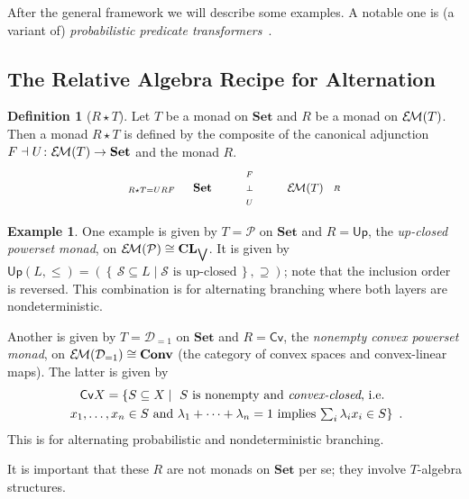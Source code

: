 \documentclass[9pt, preprint]{sigplanconf}
\theoremstyle{theorem}
\theoremstyle{definition}
\newtheorem{definition}[theorem]{Definition}
\newtheorem{example}[theorem]{Example}
\newcommand{\calS}{\mathcal{S}}
\newcommand{\pow}{\mathcal{P}}
\newcommand{\dist}{\mathcal{D}_{=1}}
\newcommand{\set}[2]{\left\{\, #1 \mathrel{}\middle|\mathrel{} #2 \,\right\}}
\newcommand{\Set}{\mathbf{Set}}
\newcommand{\Sets}{\Set}
\newcommand{\CL}{\mathbf{CL}}
\newcommand{\Conv}{\mathbf{Conv}}
\newcommand{\EM}{\mathcal{E}{\kern-.5ex}\mathcal{M}}
\newcommand{\biglor}{\bigvee}
\newcommand{\Upx}{\mathsf{Up}}
\renewcommand{\subset}{\subseteq}
\newcommand{\RC}{\mathsf{Cv}}
\begin{document}
After
the general framework we will describe some examples. A notable
one is (a variant of)  \emph{probabilistic predicate transformers}~\cite{MorganMS96}.



\subsection{The Relative Algebra Recipe for Alternation}
\label{sub:general-theory-two-player}



\begin{definition}[$R\star T$]
  Let $T$ be a monad on $\Set$ and $R$ be a monad on $\EM(T)$.
  Then a monad $R \star T$ is defined by the composite of the
  canonical adjunction $F \dashv U \colon \EM(T) \to \Set$
  and the monad $R$.
  \begin{equation}\label{eq:monad-composition}
   \small
    \vcenter{
    \xymatrix@R-1.2em{
      \Set
        \ar@(lu,ld)_-{R \star T = U R F}[]
        \ar@/^/[rr]^-{F}
        \ar@{}[rr]|-{\bot}
      &&  \EM(T) \ar@/^/[ll]^-{U}
        \ar@(ru,rd)^-{R}[]
    }}
  \end{equation}
\end{definition}
\begin{example}\label{ex:rStarTExample}
 One example is given by $T=\pow$ on $\Sets$ and $R=\Upx$, the
 \emph{up-closed powerset monad}, on $\EM(\pow)\cong \CL_{\biglor}$.
 It is given by
 \begin{math}
      \Upx (L, \le) = (\set{\calS \subset L}{\text{$\calS$ is up-closed}}, \supseteq)
 \end{math}; note that the inclusion order is reversed.
 This combination is for alternating branching where both layers are
 nondeterministic.

Another is given by
 $T=\dist$ on $\Sets$ and $R=\RC$, the
 \emph{nonempty convex powerset monad}, on $\EM(\dist)\cong \Conv$ (the
 category of convex spaces and convex-linear maps). The latter is given
 by
 \begin{multline*}
  \RC X =\{S\subset X\mid \text{
  $S$ is nonempty and \emph{convex-closed}, i.e.\
}
  \\
  \text{  $x_{1},\dotsc,x_{n}\in S$ and $\lambda_{1}+\cdots+\lambda_{n}=1$
  implies $\textstyle\sum_{i}\lambda_{i}x_{i}\in S$}\}\enspace.
 \end{multline*}
 This is
 for  alternating probabilistic and nondeterministic branching.

 It is important that these $R$ are not monads on $\Sets$ per se; they involve
 $T$-algebra structures.
\end{example}
\end{document}
